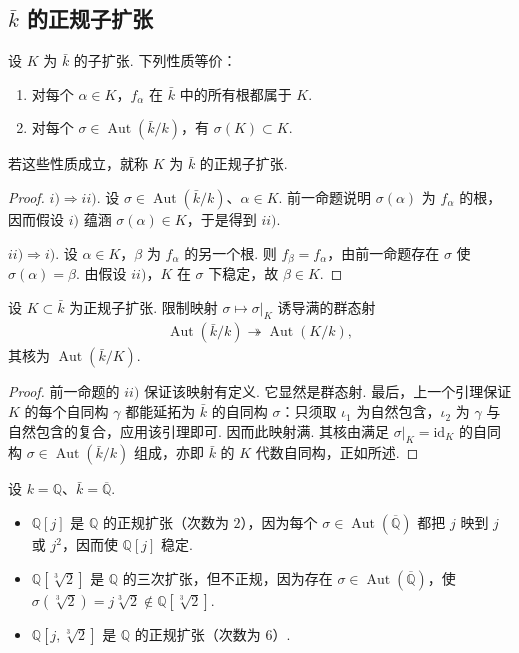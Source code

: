 \subsection{$\bar k$ 的正规子扩张}\label{sec:galois-2-3-3}
\begin{proposition*}
设 $K$ 为 $\bar k$ 的子扩张. 下列性质等价：
\begin{enumerate}[label=\roman*)]
\item 对每个 $\alpha\in K$，$f_\alpha$ 在 $\bar k$ 中的所有根都属于 $K$.
\item 对每个 $\sigma\in\operatorname{Aut}(\bar k/k)$，有 $\sigma(K)\subset K$.
\end{enumerate}
若这些性质成立，就称 $K$ 为 $\bar k$ 的正规子扩张.
\end{proposition*}
\begin{proof}
$i)\Rightarrow ii)$. 设 $\sigma\in\operatorname{Aut}(\bar k/k)$、$\alpha\in K$. 前一命题说明 $\sigma(\alpha)$ 为 $f_\alpha$ 的根，因而假设 $i)$ 蕴涵 $\sigma(\alpha)\in K$，于是得到 $ii)$.

$ii)\Rightarrow i)$. 设 $\alpha\in K$，$\beta$ 为 $f_\alpha$ 的另一个根. 则 $f_\beta=f_\alpha$，由前一命题存在 $\sigma$ 使 $\sigma(\alpha)=\beta$. 由假设 $ii)$，$K$ 在 $\sigma$ 下稳定，故 $\beta\in K$.
\end{proof}
\begin{corollary*}
设 $K\subset\bar k$ 为正规子扩张. 限制映射 $\sigma\mapsto\sigma|_K$ 诱导满的群态射
\begin{align*}
\operatorname{Aut}(\bar k/k)\twoheadrightarrow\operatorname{Aut}(K/k),
\end{align*}
其核为 $\operatorname{Aut}(\bar k/K)$.
\end{corollary*}
\begin{proof}
前一命题的 $ii)$ 保证该映射有定义. 它显然是群态射. 最后，上一个引理保证 $K$ 的每个自同构 $\gamma$ 都能延拓为 $\bar k$ 的自同构 $\sigma$：只须取 $\iota_1$ 为自然包含，$\iota_2$ 为 $\gamma$ 与自然包含的复合，应用该引理即可. 因而此映射满. 其核由满足 $\sigma|_K=\mathrm{id}_K$ 的自同构 $\sigma\in\operatorname{Aut}(\bar k/k)$ 组成，亦即 $\bar k$ 的 $K$ 代数自同构，正如所述.
\end{proof}
\begin{example*}
设 $k=\mathbb Q$、$\bar k=\overline{\mathbb Q}$.
\begin{itemize}
\item $\mathbb Q[j]$ 是 $\mathbb Q$ 的正规扩张（次数为 $2$），因为每个 $\sigma\in\operatorname{Aut}(\overline{\mathbb Q})$ 都把 $j$ 映到 $j$ 或 $j^2$，因而使 $\mathbb Q[j]$ 稳定.
\item $\mathbb Q[\sqrt[3]{2}]$ 是 $\mathbb Q$ 的三次扩张，但不正规，因为存在 $\sigma\in\operatorname{Aut}(\overline{\mathbb Q})$，使 $\sigma(\sqrt[3]{2})=j\sqrt[3]{2}\notin\mathbb Q[\sqrt[3]{2}]$.
\item $\mathbb Q[j,\sqrt[3]{2}]$ 是 $\mathbb Q$ 的正规扩张（次数为 $6$）.
\end{itemize}
\end{example*}
